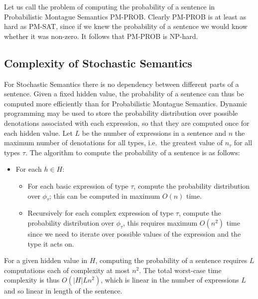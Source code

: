 \documentclass[a4paper,11pt]{article}
\theoremstyle{definition}
\begin{document}
Let us call the problem of computing the probability of a sentence in
Probabilistic Montague Semantics PM-PROB. Clearly PM-PROB is at least
as hard as PM-SAT, since if we knew the probability of a sentence we
would know whether it was non-zero. It follows that PM-PROB is NP-hard.

\subsection{Complexity of Stochastic Semantics}

For Stochastic Semantics there is no dependency between different parts of a sentence.
Given a fixed hidden value, the probability
of a sentence can thus be computed more efficiently than for
Probabilistic Montague Semantics. Dynamic
programming may be used to store the probability distribution over possible
denotations associated with each expression, so that they are computed once for
each hidden value. Let $L$ be the number of expressions in a sentence and
$n$ the maximum number of denotations for all types, i.e.~the greatest
value of $n_\tau$ for all types $\tau$. The algorithm to compute the
probability of a sentence is as follows:
\begin{itemize}
\item For each $h\in H$:
\begin{itemize}
\item For each basic expression of type $\tau$, compute the
  probability distribution over $\phi_\tau$; this can be computed in
  maximum $O(n)$ time.
\item Recursively for each complex expression of type $\tau$, compute
  the probability distribution over $\phi_\tau$, this requires maximum
  $O(n^2)$ time since we need to iterate over possible values of the
  expression and the type it acts on.
\end{itemize}
\end{itemize}
For a given hidden value in $H$, computing the probability of a sentence requires $L$
computations each of complexity at most $n^2$. The total worst-case
time complexity  is thus $O(|H|Ln^2)$, which is linear in the number of expressions $L$ and so linear in length of the sentence. 




\end{document}
